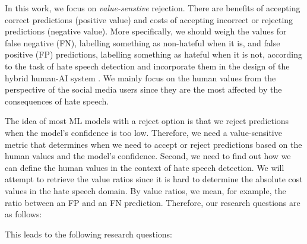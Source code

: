In this work, we focus on \textit{value-senstive} rejection. There are benefits of accepting correct predictions (positive value) and costs of accepting incorrect or rejecting predictions (negative value). More
specifically, we should weigh the values for false negative (FN), labelling something as non-hateful when it is, and false positive (FP) predictions, labelling something as hateful when it is not, according to the task of hate speech detection and incorporate them in the design of the hybrid human-AI system  \citep{sayin2021science}. We mainly focus on the human values from the perspective of the social media users since they are the most affected by the consequences of hate speech.

The idea of most ML models with a reject option is that we reject predictions when the model's confidence is too low. Therefore, we need a value-sensitive metric that determines when we need to accept or reject predictions based on the human values and the model's confidence. Second, we need to find out how we can define the human values in the context of hate speech detection. We will attempt to retrieve the value ratios since it is hard to determine the absolute cost values in the hate speech domain. By value ratios, we mean, for example, the ratio between an FP and an FN prediction. Therefore, our research questions are as follows:

This leads to the following research questions:


\noindent{}

